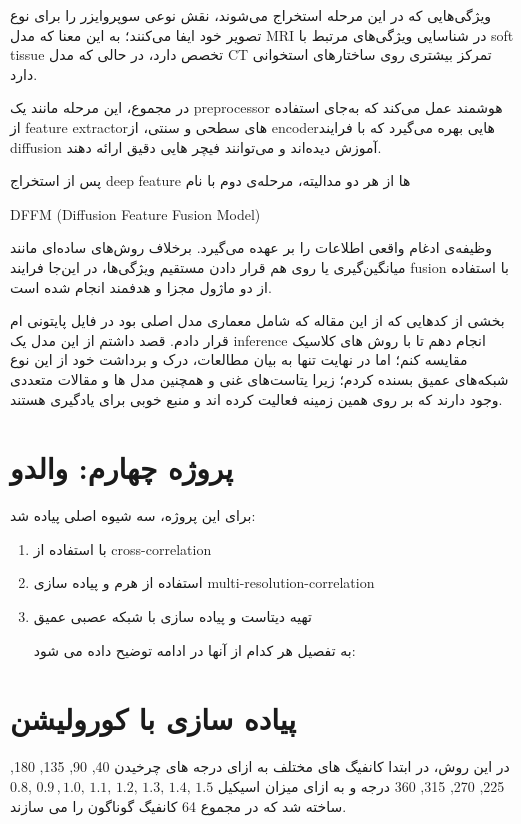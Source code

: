 \documentclass[a4paper,12pt]{article}
\begin{document}
 ویژگی‌هایی که در این مرحله استخراج می‌شوند، نقش نوعی سوپروایزر را برای نوع تصویر خود ایفا می‌کنند؛ به این معنا که مدل MRI در شناسایی ویژگی‌های مرتبط با soft tissue تخصص دارد، در حالی که مدل CT تمرکز بیشتری روی ساختارهای استخوانی دارد.
 
 در مجموع، این مرحله مانند یک preprocessor هوشمند عمل می‌کند که به‌جای استفاده از feature extractorهای سطحی و سنتی، از encoderهایی بهره می‌گیرد که با فرایند diffusion آموزش دیده‌اند و می‌توانند فیچر ‌هایی دقیق ارائه دهند.
 
 پس از استخراج deep feature
 ها از هر دو مدالیته، مرحله‌ی دوم با نام 
 \begin{latin}
DFFM (Diffusion Feature Fusion Model) 
 \end{latin}
 
 
 وظیفه‌ی ادغام واقعی اطلاعات را بر عهده می‌گیرد. برخلاف روش‌های ساده‌ای مانند میانگین‌گیری یا روی هم قرار دادن مستقیم ویژگی‌ها، در این‌جا فرایند fusion با استفاده از دو ماژول مجزا و هدفمند انجام شده است.
 

بخشی از کدهایی که از این مقاله که شامل معماری مدل اصلی بود در فایل پایتونی ام قرار دادم.
قصد داشتم از این مدل یک inference انجام دهم تا با روش های کلاسیک مقایسه کنم؛ اما در نهایت تنها به بیان مطالعات، درک و برداشت خود از این نوع شبکه‌های عمیق بسنده کردم؛ زیرا  یتاست‌های غنی و همچنین مدل‌ ها و مقالات متعددی وجود دارند که بر روی همین زمینه فعالیت کرده اند و منبع خوبی برای یادگیری هستند.

\pagebreak
\section{پروژه چهارم: والدو}
برای این پروژه، سه شیوه اصلی پیاده شد:
\begin{enumerate}
	\item  با استفاده از cross-correlation
	\item استفاده از هرم و پیاده سازی multi-resolution-correlation
	\item تهیه دیتاست و پیاده سازی با شبکه عصبی عمیق
	
	به تفصیل هر کدام از آنها در ادامه توضیح داده می شود:
	
\end{enumerate}


\section*{پیاده سازی با کورولیشن}
در این روش، در ابتدا کانفیگ های مختلف به ازای درجه های چرخیدن
40, 90, 135, 180, 225, 270, 315, 360 درجه و به ازای میزان اسیکیل
$
 0.8,\, 0.9 \, , 1.0,\,  1.1, \, 1.2,\,  1.3,\,  1.4,\, 1.5$
 ساخته شد که در مجموع 64 کانفیگ گوناگون را می سازند. 
  
\end{document}
